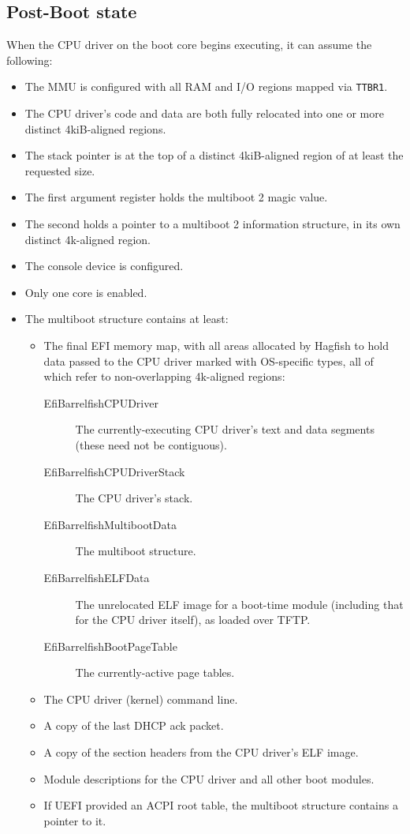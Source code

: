 \documentclass[a4paper,twoside]{report}
\begin{document}
\subsection{Post-Boot state}

When the CPU driver on the boot core begins executing, it can assume the
following:

\begin{itemize}
\item The MMU is configured with all RAM and I/O regions mapped via
\texttt{TTBR1}.
\item The CPU driver's code and data are both fully relocated into one or more
distinct 4kiB-aligned regions.
\item The stack pointer is at the top of a distinct 4kiB-aligned region of at
least the requested size.
\item The first argument register holds the multiboot 2 magic value.
\item The second holds a pointer to a multiboot 2 information structure, in
its own distinct 4k-aligned region.
\item The console device is configured.
\item Only one core is enabled.
\item The multiboot structure contains at least:
    \begin{itemize}
    \item The final EFI memory map, with all areas allocated by Hagfish to
    hold data passed to the CPU driver marked with OS-specific types, all of
    which refer to non-overlapping 4k-aligned regions:
        \begin{description}
        \item[\ttfamily EfiBarrelfishCPUDriver]
        The currently-executing CPU driver's text and data segments (these
        need not be contiguous).
        \item[\ttfamily EfiBarrelfishCPUDriverStack]
        The CPU driver's stack.
        \item[\ttfamily EfiBarrelfishMultibootData]
        The multiboot structure.
        \item[\ttfamily EfiBarrelfishELFData]
        The unrelocated ELF image for a boot-time module (including that for
        the CPU driver itself), as loaded over TFTP.
        \item[\ttfamily EfiBarrelfishBootPageTable]
        The currently-active page tables.
        \end{description}
    \item The CPU driver (kernel) command line.
    \item A copy of the last DHCP ack packet.
    \item A copy of the section headers from the CPU driver's ELF image.
    \item Module descriptions for the CPU driver and all other boot modules.
    \item If UEFI provided an ACPI root table, the multiboot structure
    contains a pointer to it.
    \end{itemize}
\end{itemize}
\end{document}

